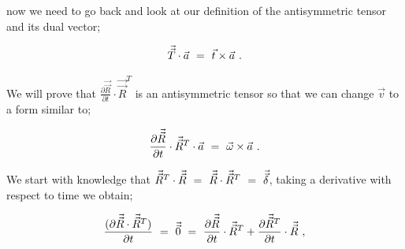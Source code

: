 \documentclass{article}
\begin{document}
now we need to go back and look at our definition of the antisymmetric tensor and its dual vector;

\begin{equation} \label{eb-eq-1-53}
\vec{\vec{T}} \cdot \vec{a} \hspace{0.125cm} = \hspace{0.125cm} \vec{t} \times \vec{a} \hspace{0.125cm} . 
\end{equation}

We will prove that \begin{math} \frac{\partial{\vec{\vec{R}}}}{\partial{t}} \cdot  \vec{\vec{R}}^{T} \end{math} is an antisymmetric tensor so that we can change \begin{math} \vec{v} \end{math} to a form similar to;

\begin{equation} \label{eb-eq-1-54}
\frac{\partial{\vec{\vec{R}}}}{\partial{t}} \cdot  \vec{\vec{R}}^{T} \cdot \vec{a} \hspace{0.125cm} = \hspace{0.125cm} \vec{\omega} \times \vec{a} \hspace{0.125cm} . 
\end{equation}

We start with knowledge that \begin{math} \vec{\vec{R}}^{T} \cdot \vec{\vec{R}} \hspace{0.125cm} = \hspace{0.125cm} \vec{\vec{R}} \cdot \vec{\vec{R}}^{T} \hspace{0.125cm} = \hspace{0.125cm} \vec{\vec{\delta}} \end{math}, taking a derivative with respect to time we obtain;

\begin{equation} \label{eb-eq-1-55}
\frac{(\partial{\vec{\vec{R}} \cdot \vec{\vec{R}}^{T}})}{\partial{t}} \hspace{0.125cm} = \hspace{0.125cm} \vec{\vec{0}} \hspace{0.125cm} = \hspace{0.125cm} \frac{\partial{\vec{\vec{R}}}}{\partial{t}} \cdot  \vec{\vec{R}}^{T} + \frac{\partial{\vec{\vec{R}}^{T}}}{\partial{t}} \cdot  \vec{\vec{R}}\hspace{0.125cm} ,
\end{equation}
\end{document}
